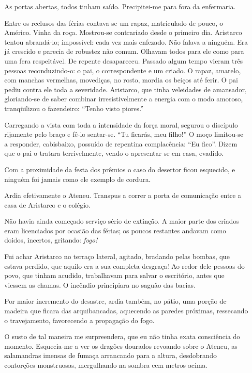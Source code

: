 As portas abertas, todos tinham saído. Precipitei{}-me para
fora da enfermaria. 

Entre os reclusos das férias contava{}-se um rapaz,
matriculado de pouco, o Américo. Vinha da roça. Mostrou{}-se
contrariado desde o primeiro dia. Aristarco tentou abrandá{}-lo;
impossível: cada vez mais enfezado. Não falava a ninguém. Era já
crescido e parecia de robustez não comum. Olhavam todos para ele como
para uma fera respeitável. De repente desapareceu. Passado algum tempo
vieram três pessoas reconduzindo{}-o: o pai, o correspondente e um
criado. O rapaz, amarelo, com manchas vermelhas, movediças, no rosto,
mordia os beiços até ferir. O pai pediu contra ele toda a severidade.
Aristarco, que tinha veleidades de amansador, gloriando{}-se de saber
combinar irresistivelmente a energia com o modo amoroso, tranqüilizou o
fazendeiro: ``Tenho visto piores.'' 

Carregando a vista com toda a
intensidade da força moral, segurou o discípulo rijamente pelo braço e
fê{}-lo sentar{}-se. ``Tu ficarás, meu filho!'' O moço limitou{}-se a
responder, cabisbaixo, possuído de repentina complacência: ``Eu fico''.
Dizem que o pai o tratara terrivelmente, vendo{}-o apresentar{}-se em
casa, evadido. 

Com a proximidade da festa dos prêmios o caso do
desertor ficou esquecido, e ninguém foi jamais como ele exemplo de
cordura. 

Ardia efetivamente o Ateneu. Transpus a correr a porta de
comunicação entre a casa de Aristarco e o colégio. 

Não havia ainda
começado serviço sério de extinção. A maior parte dos criados eram
licenciados por ocasião das férias; os poucos restantes andavam como
doidos, incertos, gritando: \textit{fogo!}

Fui achar Aristarco no terraço
lateral, agitado, bradando pelas bombas, que estava perdido, que aquilo
era a sua completa desgraça! Ao redor dele pessoas do povo, que tinham
acudido, trabalhavam para salvar o escritório, antes que viessem as
chamas. O incêndio principiara no saguão das bacias. 

Por maior incremento do desastre, ardia também, 
no pátio, uma porção de madeira
que ficara das arquibancadas, aquecendo as paredes próximas, ressecando
o travejamento, favorecendo a propagação do fogo. 

O susto de tal
maneira me surpreendera, que eu não tinha exata consciência do momento.
Esquecia{}-me a ver os dragões dourados revoando sobre o Ateneu, as
salamandras imensas de fumaça arrancando para a altura, desdobrando
contorções monstruosas, mergulhando na sombra cem metros acima. 

